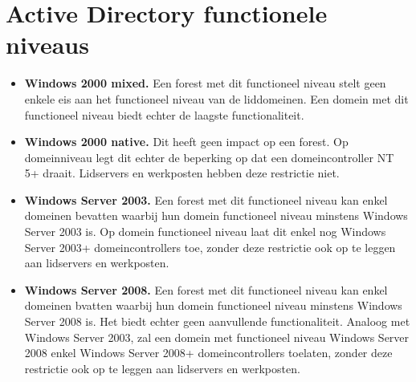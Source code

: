 \documentclass{report}
\begin{document}
	\section{Active Directory functionele niveaus }
	\begin{enumerate}
		 {
			\begin{itemize}
				\item \textbf{Windows 2000 mixed.} Een forest met dit functioneel niveau stelt geen enkele eis aan het functioneel niveau van de liddomeinen. Een domein met dit functioneel niveau biedt echter de laagste functionaliteit. 
				\item \textbf{Windows 2000 native.} Dit heeft geen impact op een forest. Op domeinniveau legt dit echter de beperking op dat een domeincontroller NT 5+ draait. Lidservers en werkposten hebben deze restrictie niet.
				\item \textbf{Windows Server 2003.} Een forest met dit functioneel niveau kan enkel domeinen bevatten waarbij hun domein functioneel niveau minstens Windows Server 2003 is. Op domein functioneel niveau laat dit enkel nog Windows Server 2003+ domeincontrollers toe, zonder deze restrictie ook op te leggen aan lidservers en werkposten. 
				\item \textbf{Windows Server 2008.} Een forest met dit functioneel niveau kan enkel domeinen bvatten waarbij hun domein functioneel niveau minstens Windows Server 2008 is. Het biedt echter geen aanvullende functionaliteit. Analoog met Windows Server 2003, zal een domein met functioneel niveau Windows Server 2008 enkel Windows Server 2008+ domeincontrollers toelaten, zonder deze restrictie ook op te leggen aan lidservers en werkposten. 
			\end{itemize}
			
}
\end{enumerate}
\end{document}
